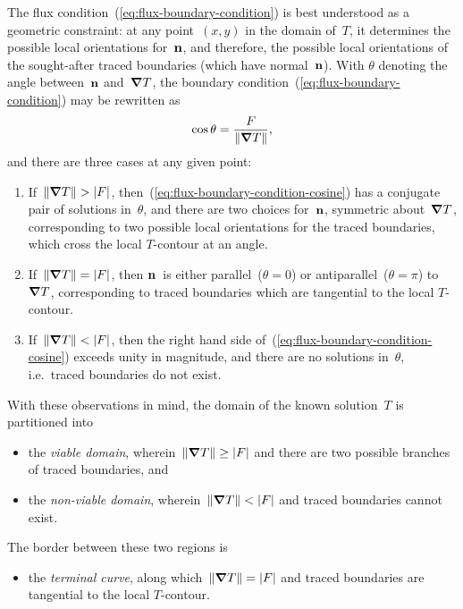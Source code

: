 The flux condition~(\ref{eq:flux-boundary-condition})
is best understood as a geometric constraint:
at any point~$(x, y)$ in the domain of~$T$,
it determines the possible local orientations for~$\mathop{}\!\boldsymbol{\mathrm{n}}$,
and therefore, the possible local orientations
of the sought-after traced boundaries
(which have normal~$\mathop{}\!\boldsymbol{\mathrm{n}}$).
With $\theta$ denoting the angle between~$\mathop{}\!\boldsymbol{\mathrm{n}}$ and~$\mathop{}\!\boldsymbol{\mathrm{\nabla}} T$,
the boundary condition~(\ref{eq:flux-boundary-condition}) may be rewritten as
\begin{equation}
  \cos\theta = \frac{F}{\lVert\mathop{}\!\boldsymbol{\mathrm{\nabla}} T\rVert},
  \label{eq:flux-boundary-condition-cosine}
\end{equation}
and there are three cases at any given point:
\begin{enumerate}
  \item
    If~$\lVert\mathop{}\!\boldsymbol{\mathrm{\nabla}} T\rVert > \lvert F\rvert$,
    then~(\ref{eq:flux-boundary-condition-cosine})
    has a conjugate pair of solutions in~$\theta$,
    and there are two choices for~$\mathop{}\!\boldsymbol{\mathrm{n}}$,
    symmetric about~$\mathop{}\!\boldsymbol{\mathrm{\nabla}} T$,
    corresponding to two possible local orientations
    for the traced boundaries,
    which cross the local $T$-contour at an angle.
  \item
    If~$\lVert\mathop{}\!\boldsymbol{\mathrm{\nabla}} T\rVert = \lvert F\rvert$,
    then $\mathop{}\!\boldsymbol{\mathrm{n}}$~is either parallel~($\theta = 0$)
    or antiparallel~($\theta = \pi$) to~$\mathop{}\!\boldsymbol{\mathrm{\nabla}} T$,
    corresponding to traced boundaries which are tangential
    to the local $T$-contour.
  \item
    If~$\lVert\mathop{}\!\boldsymbol{\mathrm{\nabla}} T\rVert < \lvert F\rvert$,
    then the right hand side of~(\ref{eq:flux-boundary-condition-cosine})
    exceeds unity in magnitude,
    and there are no solutions in~$\theta$,
    i.e.~traced boundaries do not exist.
\end{enumerate}
With these observations in mind,
the domain of the known solution~$T$
is partitioned into
\begin{itemize}
  \item
    the \emph{viable domain},
    wherein~$\lVert\mathop{}\!\boldsymbol{\mathrm{\nabla}} T\rVert \ge \lvert F\rvert$
    and there are two possible branches of traced boundaries,
    and
  \item
    the \emph{non-viable domain},
    wherein~$\lVert\mathop{}\!\boldsymbol{\mathrm{\nabla}} T\rVert < \lvert F\rvert$
    and traced boundaries cannot exist.
\end{itemize}
The border between these two regions is
\begin{itemize}
  \item
    the \emph{terminal curve},
    along which~$\lVert\mathop{}\!\boldsymbol{\mathrm{\nabla}} T\rVert = \lvert F\rvert$
    and traced boundaries are tangential to the local $T$-contour.
\end{itemize}
